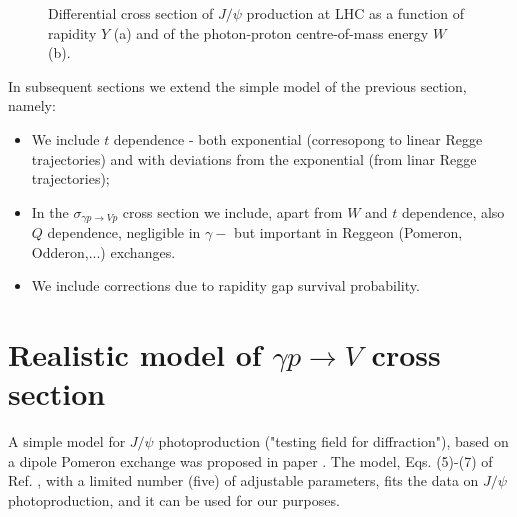 \documentclass[12pt]{article}
\begin{document}
\begin{figure}[!h]
  \centering
  \caption{Differential cross section of $J/\psi$ production at LHC as a function of rapidity $Y$ (a) and of the photon-proton centre-of-mass energy $W$ (b).}
\end{figure}

In subsequent sections we extend the simple model of the previous section, namely:
\begin{itemize}
\item We include $t$ dependence - both exponential (corresopong to linear Regge trajectories) and with deviations from the exponential (from linar Regge trajectories); 
\item In the $\sigma_{\gamma p \rightarrow V p}$ cross section we include, apart from $W$ and $t$ dependence, also $Q$ dependence, negligible in $\gamma-$ but important in Reggeon (Pomeron, Odderon,...) exchanges. 
\item We include corrections due to rapidity gap survival probability.
\end{itemize} 

\section{Realistic model of $\gamma p\rightarrow V$ cross section}\label{realistic}
A simple model for $J/\psi$ photoproduction ("testing field for diffraction"), based on a dipole Pomeron exchange 
was proposed in paper \cite{Francesco}. The model, Eqs. (5)-(7) of 
Ref. \cite{Francesco}, with a limited number (five) of adjustable parameters, fits the data on $J/\psi$ photoproduction, and it can be used for our purposes.
\end{document}
